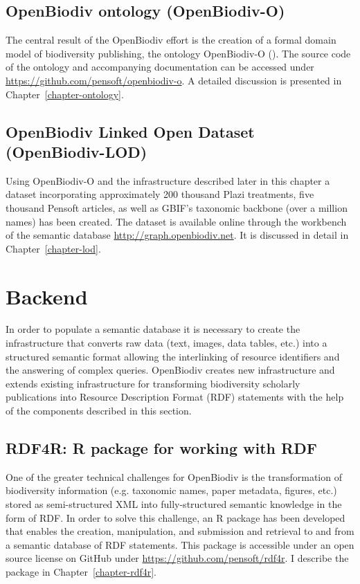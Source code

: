 \subsection{OpenBiodiv ontology (OpenBiodiv-O)}

The central result of the OpenBiodiv effort is the creation of a formal domain model of biodiversity publishing, the ontology OpenBiodiv-O (\cite{senderov_openbiodiv_2017}). The source code of the ontology and accompanying documentation can be accessed under \url{https://github.com/pensoft/openbiodiv-o}. A detailed discussion is presented in Chapter~\ref{chapter-ontology}.

\subsection{OpenBiodiv Linked Open Dataset (OpenBiodiv-LOD)}

Using OpenBiodiv-O and the infrastructure described later in this chapter a dataset incorporating approximately 200 thousand Plazi treatments, five thousand Pensoft articles, as well as GBIF’s taxonomic backbone (over a million names) has been created. The dataset is available online through the workbench of the semantic database \url{http://graph.openbiodiv.net}. It is discussed in detail in Chapter~\ref{chapter-lod}.

\section{Backend}

In order to populate a semantic database it is necessary to create the infrastructure that converts raw data (text, images, data tables, etc.) into a structured semantic format allowing the interlinking of resource identifiers and the answering of complex queries. OpenBiodiv creates new infrastructure and extends existing infrastructure for transforming biodiversity scholarly publications into Resource Description Format (RDF) statements with the help of the components described in this section.

\subsection{RDF4R: R package for working with RDF}

One of the greater technical challenges for OpenBiodiv is the transformation of biodiversity information (e.g. taxonomic names, paper metadata, figures, etc.) stored as semi-structured XML into fully-structured semantic knowledge in the form of RDF. In order to solve this challenge, an R package has been developed that enables the creation, manipulation, and submission and retrieval to and from a semantic database of RDF statements. This package is accessible under an open source license on GitHub under \url{https://github.com/pensoft/rdf4r}. I describe the package in Chapter~\ref{chapter-rdf4r}.


